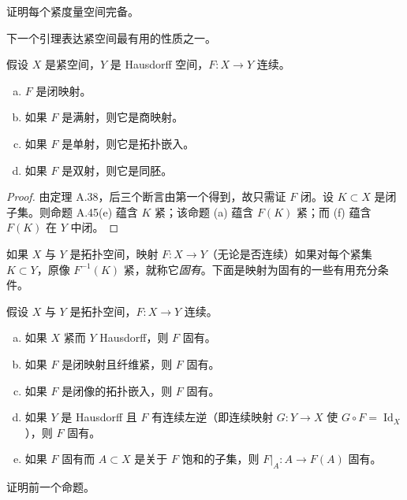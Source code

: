 \documentclass[../../main.tex]{subfiles}
\begin{document}
\begin{exercise}\label{exercise:appA-A-51}
证明每个紧度量空间完备。
\end{exercise}

下一个引理表达紧空间最有用的性质之一。

\begin{lemma}[闭映射引理]\label{lemma:appA-closed-map-lemma}
假设 $X$ 是紧空间，$Y$ 是 Hausdorff 空间，$F:X\to Y$ 连续。
\begin{enumerate}[(a)]
\item $F$ 是闭映射。
\item 如果 $F$ 是满射，则它是商映射。
\item 如果 $F$ 是单射，则它是拓扑嵌入。
\item 如果 $F$ 是双射，则它是同胚。
\end{enumerate}
\end{lemma}

\begin{proof}
由定理 A.38，后三个断言由第一个得到，故只需证 $F$ 闭。设 $K\subset X$ 是闭子集。则命题 A.45(e) 蕴含 $K$ 紧；该命题 (a) 蕴含 $F(K)$ 紧；而 (f) 蕴含 $F(K)$ 在 $Y$ 中闭。
\end{proof}

如果 $X$ 与 $Y$ 是拓扑空间，映射 $F:X\to Y$（无论是否连续）如果对每个紧集 $K\subset Y$，原像 $F^{-1}(K)$ 紧，就称它\emph{固有}。下面是映射为固有的一些有用充分条件。

\begin{proposition}[固有性的充分条件]\label{proposition:appA-proper-sufficient}
假设 $X$ 与 $Y$ 是拓扑空间，$F:X\to Y$ 连续。
\begin{enumerate}[(a)]
\item 如果 $X$ 紧而 $Y$ Hausdorff，则 $F$ 固有。
\item 如果 $F$ 是闭映射且纤维紧，则 $F$ 固有。
\item 如果 $F$ 是闭像的拓扑嵌入，则 $F$ 固有。
\item 如果 $Y$ 是 Hausdorff 且 $F$ 有连续左逆（即连续映射 $G:Y\to X$ 使 $G\circ F=\operatorname{Id}_X$），则 $F$ 固有。
\item 如果 $F$ 固有而 $A\subset X$ 是关于 $F$ 饱和的子集，则 $F|_A:A\to F(A)$ 固有。
\end{enumerate}
\end{proposition}

\begin{exercise}\label{exercise:appA-A-54}
证明前一个命题。
\end{exercise}
\end{document}
